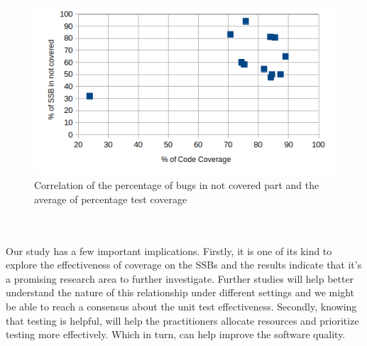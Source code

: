 \documentclass[sigconf,nonacm]{acmart}
\begin{document}
\begin{figure}[h]
	\centering
	\includegraphics[width=\linewidth]{img/correlation.png}
	\caption{Correlation of the percentage of bugs in not covered part and the average of percentage test coverage}
	\label{fig:corr}
\end{figure}



\\\\



Our study has a few important implications. Firstly, it is one of its kind to explore the effectiveness of coverage on the SSBs and the results indicate that it’s a promising research area to further investigate. Further studies will help better understand the nature of this relationship under different settings and we might be able to reach a consensus about the unit test effectiveness. Secondly, knowing that testing is helpful, will help the practitioners allocate resources and prioritize testing more effectively. Which in turn, can help improve the software quality.
\end{document}
